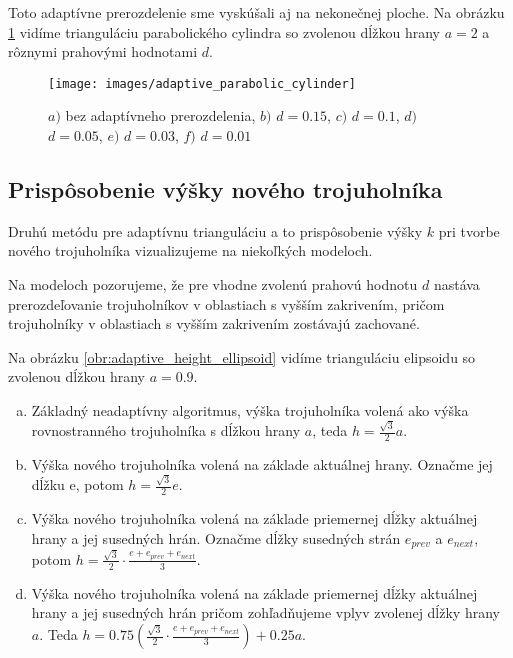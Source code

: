 Toto adaptívne prerozdelenie sme vyskúšali aj na nekonečnej ploche.
Na obrázku \ref{obr:adaptive_parabolic_cylinder} vidíme trianguláciu parabolického 
cylindra so zvolenou dĺžkou hrany $a=2$ a rôznymi prahovými hodnotami $d$.

\begin{figure}
    \centerline{\texttt{[image: images/adaptive\_parabolic\_cylinder]}}
    \caption[Adaptívne prerozdelenie parabolického cylindra.]
    {$a)$ bez adaptívneho prerozdelenia, $b)$ $d=0.15$, $c)$ $d=0.1$, $d)$ $d=0.05$, $e)$ $d=0.03$, $f)$ $d=0.01$}
    \label{obr:adaptive_parabolic_cylinder}
\end{figure}

\subsection{Prispôsobenie výšky nového trojuholníka}
Druhú metódu pre adaptívnu trianguláciu a to prispôsobenie výšky $k$ pri tvorbe nového trojuholníka 
vizualizujeme na niekoľkých modeloch.

Na modeloch pozorujeme, že pre vhodne zvolenú prahovú hodnotu $d$ nastáva prerozdeľovanie 
trojuholníkov v oblastiach s vyšším zakrivením, pričom trojuholníky v oblastiach s vyšším zakrivením 
zostávajú zachované.

Na obrázku \ref{obr:adaptive_height_ellipsoid} vidíme trianguláciu elipsoidu so zvolenou
dĺžkou hrany $a=0.9$.
\begin{enumerate}[a)]
\item{
    Základný neadaptívny algoritmus, výška trojuholníka volená ako výška rovnostranného trojuholníka
    s dĺžkou hrany $a$, teda $h=\frac{\sqrt{3}}{2} a$.
}
\item{
    Výška nového trojuholníka volená na základe aktuálnej hrany. Označme jej dĺžku e, potom  
    $h=\frac{\sqrt{3}}{2} e$.
}
\item{
    Výška nového trojuholníka volená na základe priemernej dĺžky aktuálnej hrany a jej susedných hrán. 
    Označme dĺžky susedných strán $e_{prev}$ a $e_{next}$, potom  
    $h=\frac{\sqrt{3}}{2} \cdot \frac{e+e_{prev}+e_{next}}{3}$.
}
\item{
    Výška nového trojuholníka volená na základe priemernej dĺžky aktuálnej hrany a jej susedných hrán
    pričom zohľadňujeme vplyv zvolenej dĺžky hrany $a$. Teda
    $h=0.75(\frac{\sqrt{3}}{2} \cdot \frac{e+e_{prev}+e_{next}}{3}) + 0.25 a$.
}
\end{enumerate}


